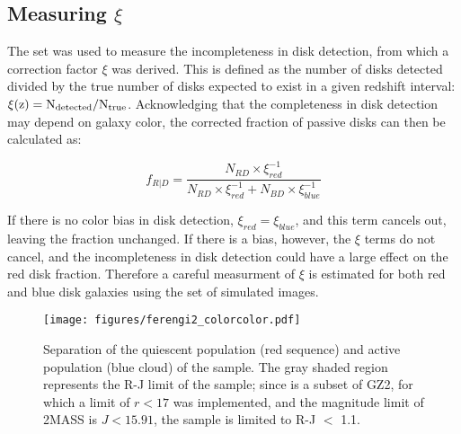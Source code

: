\subsection{Measuring $\xi$}
\label{ssec:xi}

The  set was used to measure the incompleteness in disk detection, from which a correction factor $\xi$ was derived. This is defined as the number of disks detected divided by the true number of disks expected to exist in a given redshift interval: $\rm \xi(z)=N_{detected}/N_{true}$. Acknowledging that the completeness in disk detection may depend on galaxy color, the corrected fraction of passive disks can then be calculated as:

\begin{equation}
f_{R|D}=\frac{N_{RD}\times \xi^{-1}_{red}}{N_{RD}\times \xi^{-1}_{red} + N_{BD} \times \xi^{-1}_{blue}}
\label{eqn:fdir}
\end{equation}

If there is no color bias in disk detection, $\xi_{red}=\xi_{blue}$, and this term cancels out, leaving the fraction unchanged. If there is a bias, however, the $\xi$ terms do not cancel, and the incompleteness in disk detection could have a large effect on the red disk fraction. Therefore a careful measurment of $\xi$ is estimated for both red and blue disk galaxies using the  set of simulated images.


\begin{figure}
\centering
\texttt{[image: figures/ferengi2\_colorcolor.pdf]}
\caption{Separation of the quiescent population (red sequence) and active population (blue cloud) of the  sample. The gray shaded region represents the R-J limit of the sample; since  is a subset of GZ2, for which a limit of $r<17$ was implemented, and the magnitude limit of 2MASS is $J<15.91$, the  sample is limited to R-J $<$ 1.1.}
\label{fig:ferengi2colorcolor}
\end{figure}


